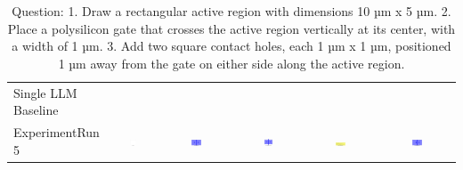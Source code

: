 \begin{table}
\begin{tabular}{@{}lccccc@{}}
    Single LLM Baseline \\
    ExperimentRun 5 & \includegraphics[width=0.15\textwidth]{./run_5/png/gpt-4o_results/BasicLayout.png} & \includegraphics[width=0.15\textwidth]{./run_5/png/o1-preview_results/BasicLayout.png} & \includegraphics[width=0.15\textwidth]{./run_5/png/claude-3-5-sonnet-20240620_results/BasicLayout.png} & \includegraphics[width=0.15\textwidth]{./run_5/png/watsonx_meta-llama_llama-3-1-70b-instruct_results/BasicLayout.png} & \includegraphics[width=0.15\textwidth]{./run_5/png/watsonx_meta-llama_llama-3-405b-instruct_results/BasicLayout.png} \\
    \bottomrule
  \end{tabular}
  \caption*{Question: 1. Draw a rectangular active region with dimensions 10 µm x 5 µm.
2. Place a polysilicon gate that crosses the active region vertically at its center, with a width of 1 µm.
3. Add two square contact holes, each 1 µm x 1 µm, positioned 1 µm away from the gate on either side along the active region.}
\end{table}


